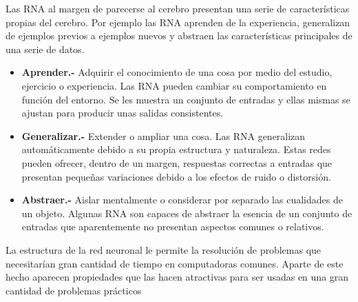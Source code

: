 \documentclass[12pt,letterpaper,titlepage]{article}
\begin{document}
\begin{itemize}
Las RNA al margen de parecerse al cerebro presentan una serie de características
propias del cerebro. Por ejemplo las RNA aprenden de la experiencia, generalizan de
ejemplos previos a ejemplos nuevos y abstraen las características principales de una
serie de datos. \cite{124}

\begin{itemize}\itemsep=0pt
\item  \textbf{Aprender.-} Adquirir el conocimiento de una cosa por medio del estudio, ejercicio
o experiencia. Las RNA pueden cambiar su comportamiento en función del entorno. Se
les muestra un conjunto de entradas y ellas mismas se ajustan para producir unas salidas
consistentes.
\item  \textbf{Generalizar.-} Extender o ampliar una cosa. Las RNA generalizan
automáticamente debido a su propia estructura y naturaleza. Estas redes pueden ofrecer,
dentro de un margen, respuestas correctas a entradas que presentan pequeñas
variaciones debido a los efectos de ruido o distorsión.
\item  \textbf{Abstraer.-} Aislar mentalmente o considerar por separado las cualidades de un
objeto. Algunas RNA son capaces de abstraer la esencia de un conjunto de entradas que
aparentemente no presentan aspectos comunes o relativos.
\end{itemize}

%
%
%
%
%

La estructura de la red neuronal le permite la resolución de problemas que necesitarían gran cantidad de tiempo en computadoras comunes. Aparte de este hecho aparecen propiedades que las hacen atractivas para ser usadas en una gran cantidad de problemas prácticos \cite{125}


\end{itemize}
\end{document}
